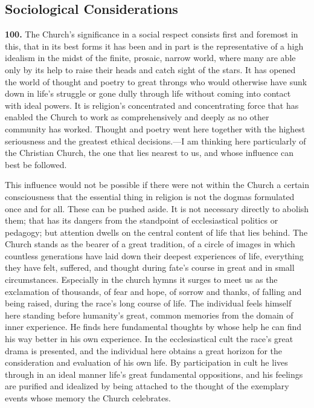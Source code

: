 \documentclass[12pt,a4paper]{book}
\newcommand{\opage}[1]{\marginnote{\footnotesize\textit{[#1]}}}
\begin{document}
\subsection{Sociological Considerations}
\label{ssec:sociol-considerations}

\noindent\textbf{100.} The Church's significance in a social respect consists first and foremost in
this, that in its best forms it has been and in part is the representative of a high idealism in the
midst of the finite, 
\opage{226}prosaic, narrow world, where many are able only by its help to raise their
heads and catch sight of the stars. It has opened the world of thought and poetry to great throngs
who would otherwise have sunk down in life's struggle or gone dully through life without coming into
contact with ideal powers. It is religion's concentrated and concentrating force that has enabled the
Church to work as comprehensively and deeply as no other community has worked. Thought and poetry
went here together with the highest seriousness and the greatest ethical decisions.---I am thinking
here particularly of the Christian Church, the one that lies nearest to us, and whose influence can
best be followed.

This influence would not be possible if there were not within the Church a certain consciousness that
the essential thing in religion is not the dogmas formulated once and for all. These can be pushed
aside. It is not necessary directly to abolish them; that has its dangers from the standpoint of
ecclesiastical politics or pedagogy; but attention dwells on the central content of life that lies
behind. The Church stands as the bearer of a great tradition, of a circle of images in which countless
generations have laid down their deepest experiences of life, everything they have felt, suffered, and
thought during fate's course in great and in small circumstances. Especially in the church hymns it
surges to meet us as the exclamation of thousands, of fear and hope, of sorrow and thanks, of falling
and being raised, during the race's long course of life. The individual feels himself here standing
before humanity's great, common memories from the domain of inner experience. He finds here fundamental
thoughts by whose help he can find his way better in his own experience. In the ecclesiastical cult the
race's great drama is presented, and the individual here obtains a great horizon for the consideration
and evaluation of his own life. By participation in cult he lives through in an ideal manner life's
great fundamental oppositions, and his feelings are purified and idealized by being attached to the
thought of the exemplary events whose memory the Church celebrates.
\end{document}
